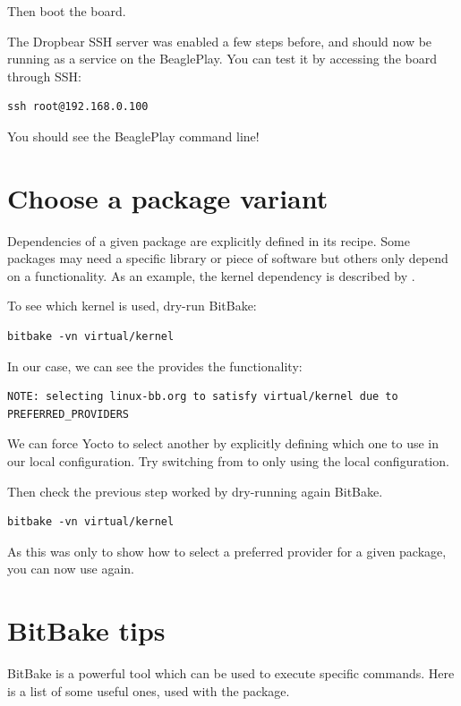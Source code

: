 Then boot the board.

The Dropbear SSH server was enabled a few steps before, and should now be
running as a service on the BeaglePlay. You can test it by accessing the
board through SSH:
\begin{verbatim}
ssh root@192.168.0.100
\end{verbatim}

You should see the BeaglePlay command line!

\section{Choose a package variant}

Dependencies of a given package are explicitly defined in its recipe.
Some packages may need a specific library or piece of software but
others only depend on a functionality. As an example, the kernel
dependency is described by .

To see which kernel is used, dry-run BitBake:
\begin{verbatim}
bitbake -vn virtual/kernel
\end{verbatim}

In our case, we can see the  provides the
 functionality:
\small
\begin{verbatim}
NOTE: selecting linux-bb.org to satisfy virtual/kernel due to PREFERRED_PROVIDERS
\end{verbatim}
\normalsize

We can force Yocto to select another  by explicitly
defining which one to use in our local configuration. Try switching
from  to  only using the
local configuration.

Then check the previous step worked by dry-running again BitBake.
\begin{verbatim}
bitbake -vn virtual/kernel
\end{verbatim}

As this was only to show how to select a preferred provider for a
given package, you can now use  again.

\section{BitBake tips}

BitBake is a powerful tool which can be used to execute specific commands. Here
is a list of some useful ones, used with the  package.

